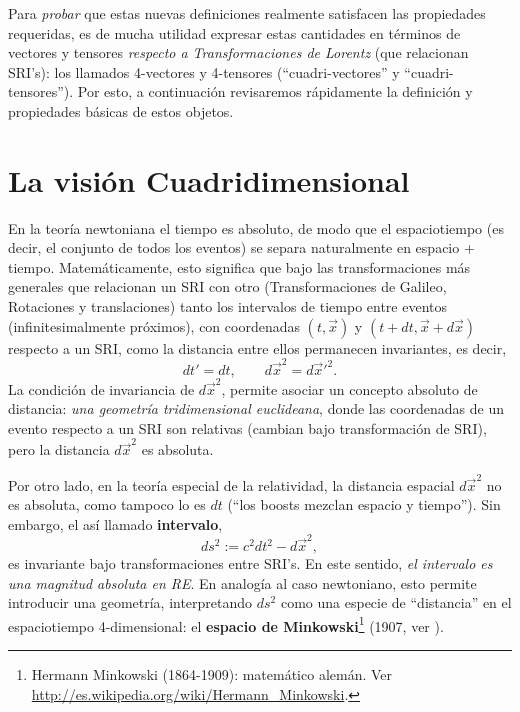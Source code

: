 Para \textit{probar} que estas nuevas definiciones realmente satisfacen las propiedades requeridas, es de mucha utilidad expresar estas cantidades en términos de vectores y tensores \textit{respecto a Transformaciones de Lorentz} (que relacionan SRI's): los llamados 4-vectores y 4-tensores (``cuadri-vectores'' y ``cuadri-tensores''). Por esto, a continuación revisaremos rápidamente la definición y propiedades básicas de estos objetos.


\section{La visión Cuadridimensional}
En la teoría newtoniana el tiempo es absoluto, de modo que el espaciotiempo (es decir, el conjunto de todos los eventos) se separa naturalmente en espacio + tiempo. Matemáticamente, esto significa que
bajo las transformaciones más generales que relacionan un SRI con otro
(Transformaciones de Galileo, Rotaciones y translaciones) tanto los intervalos de
tiempo entre eventos (infinitesimalmente próximos), con coordenadas
$(t,\vec{x})$ y $(t+dt,\vec{x}+d\vec{x})$ respecto a un SRI, como la
distancia entre ellos permanecen invariantes, es decir,
\begin{equation}
dt'=dt, \qquad d\vec{x}^2=d\vec{x}'^2.
\end{equation}
La condición de invariancia de $d\vec{x}^2$, permite asociar un concepto
absoluto de distancia: \textit{una geometría tridimensional euclideana}, donde las coordenadas de un evento respecto a un SRI son relativas (cambian bajo transformación de SRI), pero la distancia $d\vec{x}^2$ es absoluta.

Por otro lado, en la teoría especial de la relatividad, la distancia espacial $d\vec{x}^2$ no es absoluta, como tampoco lo es $dt$ (``los boosts mezclan espacio y tiempo''). Sin embargo, el así llamado \textbf{intervalo},
\begin{equation}
ds^2:=c^2dt^2-d\vec{x}^2, \label{ds}
\end{equation}
es invariante bajo transformaciones entre SRI's. En este sentido, \textit{el
intervalo es una magnitud absoluta en RE}. En analogía al caso newtoniano, esto permite introducir una geometría, interpretando $ds^2$ como una especie de ``distancia'' en el espaciotiempo 4-dimensional: el \textbf{espacio de Minkowski}\footnote{Hermann Minkowski (1864-1909): matemático alemán. Ver \url{http://es.wikipedia.org/wiki/Hermann_Minkowski}.} (1907, ver \cite{Minkowski07}).

